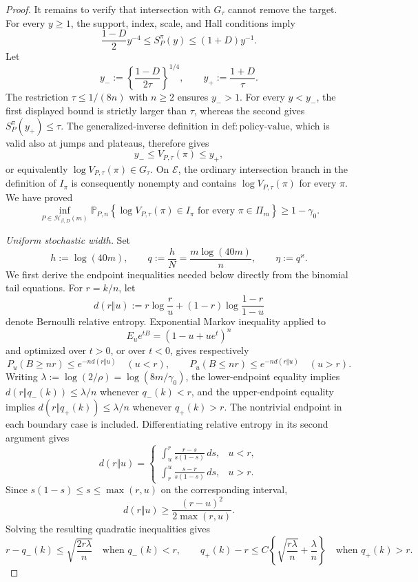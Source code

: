 \documentclass{article}
\begin{document}
\begin{proof}
It remains to verify that intersection with \(G_\tau\) cannot remove the target.  For every \(y\geq1\), the support, index, scale, and Hall conditions imply
\[
 \frac{1-D}{2}y^{-4}
 \leq S_P^\pi(y)
 \leq (1+D)y^{-1}.
\]
Let
\[
 y_-:=\left\{\frac{1-D}{2\tau}\right\}^{1/4},
 \qquad y_+:=\frac{1+D}{\tau}.
\]
The restriction \(\tau\leq1/(8n)\) with \(n\geq2\) ensures \(y_->1\).  For every \(y<y_-\), the first displayed bound is strictly larger than \(\tau\), whereas the second gives \(S_P^\pi(y_+)\leq\tau\).  The generalized-inverse definition in \(\mathrm{def{:}policy\text{-}value}\), which is valid also at jumps and plateaus, therefore gives
\[
 y_-\leq V_{P,\tau}(\pi)\leq y_+,
\]
or equivalently \(\log V_{P,\tau}(\pi)\in G_\tau\).  On \(\mathcal E\), the ordinary intersection branch in the definition of \(I_\pi\) is consequently nonempty and contains \(\log V_{P,\tau}(\pi)\) for every \(\pi\).  We have proved
\[
 \inf_{P\in\mathcal H_{\beta,D}(m)}
 \mathbb P_{P,n}\!\left\{\log V_{P,\tau}(\pi)\in I_\pi
 \text{ for every }\pi\in\Pi_m\right\}
 \geq1-\gamma_0.
\]

\emph{Uniform stochastic width.}  Set
\[
 h:=\log(40m),\qquad q:=\frac hN=\frac{m\log(40m)}n,
 \qquad \eta:=q^{\varkappa}.
\]
We first derive the endpoint inequalities needed below directly from the binomial tail equations.  For \(r=k/n\), let
\[
 d(r\Vert u):=r\log\frac ru+(1-r)\log\frac{1-r}{1-u}
\]
denote Bernoulli relative entropy.  Exponential Markov inequality applied to
\[
 E_u e^{tB}=(1-u+ue^t)^n
\]
and optimized over \(t>0\), or over \(t<0\), gives respectively
\[
 P_u(B\geq nr)\leq e^{-nd(r\Vert u)}\quad(u<r),
 \qquad
 P_u(B\leq nr)\leq e^{-nd(r\Vert u)}\quad(u>r).
\]
Writing \(\lambda:=\log(2/\rho)=\log(8m/\gamma_0)\), the lower-endpoint equality implies \(d(r\Vert q_-(k))\leq\lambda/n\) whenever \(q_-(k)<r\), and the upper-endpoint equality implies \(d(r\Vert q_+(k))\leq\lambda/n\) whenever \(q_+(k)>r\).  The nontrivial endpoint in each boundary case is included.  Differentiating relative entropy in its second argument gives
\[
 d(r\Vert u)=
 \begin{cases}
 \displaystyle\int_u^r\frac{r-s}{s(1-s)}\,ds,&u<r,\\[6pt]
 \displaystyle\int_r^u\frac{s-r}{s(1-s)}\,ds,&u>r.
 \end{cases}
\]
Since \(s(1-s)\leq s\leq\max(r,u)\) on the corresponding interval,
\[
 d(r\Vert u)\geq\frac{(r-u)^2}{2\max(r,u)}.
\]
Solving the resulting quadratic inequalities gives
\[
 r-q_-(k)\leq\sqrt{\frac{2r\lambda}{n}}
 \quad\text{when }q_-(k)<r,
 \qquad
 q_+(k)-r\leq C\left\{\sqrt{\frac{r\lambda}{n}}+\frac\lambda n\right\}
 \quad\text{when }q_+(k)>r.
 \tag{1}
\]


\end{proof}
\end{document}
